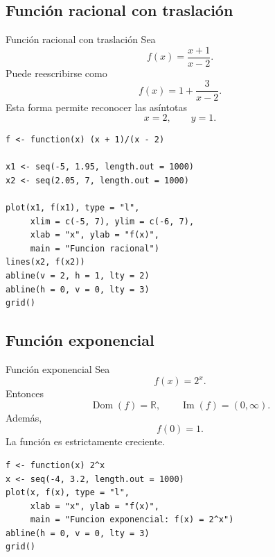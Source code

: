 \documentclass[aspectratio=169,10pt]{beamer}
\newcommand{\R}{\mathbb{R}}
\newcommand{\Dom}{\operatorname{Dom}}
\newcommand{\Ima}{\operatorname{Im}}
\begin{document}
\subsection*{Función racional con traslación}
\begin{frame}{Función racional con traslación}
Sea
\[
f(x)=\frac{x+1}{x-2}.
\]
Puede reescribirse como
\[
f(x)=1+\frac{3}{x-2}.
\]
Esta forma permite reconocer las asíntotas
\[
x=2,\qquad y=1.
\]

\begin{center}
\end{center}

\begin{verbatim}
f <- function(x) (x + 1)/(x - 2)

x1 <- seq(-5, 1.95, length.out = 1000)
x2 <- seq(2.05, 7, length.out = 1000)

plot(x1, f(x1), type = "l",
     xlim = c(-5, 7), ylim = c(-6, 7),
     xlab = "x", ylab = "f(x)",
     main = "Funcion racional")
lines(x2, f(x2))
abline(v = 2, h = 1, lty = 2)
abline(h = 0, v = 0, lty = 3)
grid()
\end{verbatim}

\end{frame}
\subsection*{Función exponencial}
\begin{frame}{Función exponencial}
Sea
\[
f(x)=2^x.
\]
Entonces
\[
\Dom(f)=\R,\qquad \Ima(f)=(0,\infty).
\]
Además,
\[
f(0)=1.
\]
La función es estrictamente creciente.

\begin{center}
\end{center}

\begin{verbatim}
f <- function(x) 2^x
x <- seq(-4, 3.2, length.out = 1000)
plot(x, f(x), type = "l",
     xlab = "x", ylab = "f(x)",
     main = "Funcion exponencial: f(x) = 2^x")
abline(h = 0, v = 0, lty = 3)
grid()
\end{verbatim}

\end{frame}
\end{document}

